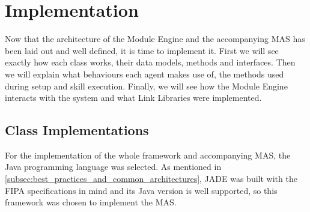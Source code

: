 


\glsresetall










\chapter{Implementation}
\label{cha:implementation}

Now that the architecture of the Module Engine and the accompanying \acrshort{MAS} has been laid out and well defined, it is time to implement it. First we will see exactly how each class works, their data models, methods and interfaces. Then we will explain what behaviours each agent makes use of, the methods used during setup and skill execution. Finally, we will see how the Module Engine interacts with the system and what Link Libraries were implemented.\\

\section{Class Implementations}
\label{sec:class_implementations}

For the implementation of the whole framework and accompanying \acrshort{MAS}, the Java programming language was selected. As mentioned in \ref{subsec:best_practices_and_common_architectures}, \acrshort{JADE} was built with the \acrshort{FIPA} specifications in mind and its Java version is well supported, so this framework was chosen to implement the \acrfull{MAS}.

